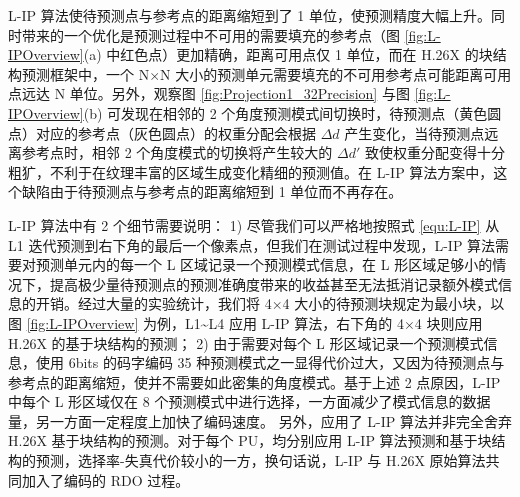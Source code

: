 L-IP 算法使待预测点与参考点的距离缩短到了 1 单位，使预测精度大幅上升。同时带来的一个优化是预测过程中不可用的需要填充的参考点（图 \ref{fig:L-IPOverview}(a) 中红色点）更加精确，距离可用点仅 1 单位，而在 H.26X 的块结构预测框架中，一个 N$\times$N 大小的预测单元需要填充的不可用参考点可能距离可用点远达 N 单位。另外，观察图 \ref{fig:Projection1_32Precision} 与图 \ref{fig:L-IPOverview}(b) 可发现在相邻的 2 个角度预测模式间切换时，待预测点（黄色圆点）对应的参考点（灰色圆点）的权重分配会根据 $\Delta d$ 产生变化，当待预测点远离参考点时，相邻 2 个角度模式的切换将产生较大的 $\Delta d{'}$ 致使权重分配变得十分粗犷，不利于在纹理丰富的区域生成变化精细的预测值。在 L-IP 算法方案中，这个缺陷由于待预测点与参考点的距离缩短到 1 单位而不再存在。

L-IP 算法中有 2 个细节需要说明：
1) 尽管我们可以严格地按照式 \ref{equ:L-IP} 从 L1 迭代预测到右下角的最后一个像素点，但我们在测试过程中发现，L-IP 算法需要对预测单元内的每一个 L 区域记录一个预测模式信息，在 L 形区域足够小的情况下，提高极少量待预测点的预测准确度带来的收益甚至无法抵消记录额外模式信息的开销。经过大量的实验统计，我们将 4$\times$4 大小的待预测块规定为最小块，以图 \ref{fig:L-IPOverview} 为例，L1\textasciitilde L4 应用 L-IP 算法，右下角的 4$\times$4 块则应用 H.26X 的基于块结构的预测；
2) 由于需要对每个 L 形区域记录一个预测模式信息，使用 6bits 的码字编码 35 种预测模式之一显得代价过大，又因为待预测点与参考点的距离缩短，使并不需要如此密集的角度模式。基于上述 2 点原因，L-IP 中每个 L 形区域仅在 8 个预测模式中进行选择，一方面减少了模式信息的数据量，另一方面一定程度上加快了编码速度。
另外，应用了 L-IP 算法并非完全舍弃 H.26X 基于块结构的预测。对于每个 PU，均分别应用 L-IP 算法预测和基于块结构的预测，选择率-失真代价较小的一方，换句话说，L-IP 与 H.26X 原始算法共同加入了编码的 RDO 过程。

